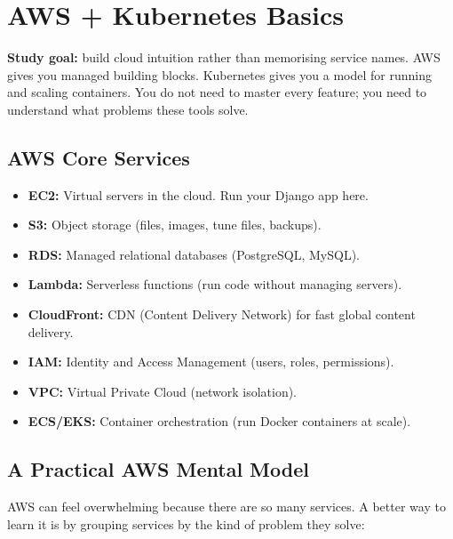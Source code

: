 \documentclass[12pt, a4paper, oneside]{book}
\begin{document}
\chapter{AWS + Kubernetes Basics}

\begin{studybox}
\textbf{Study goal:} build cloud intuition rather than memorising service names. AWS gives you managed building blocks. Kubernetes gives you a model for running and scaling containers. You do not need to master every feature; you need to understand what problems these tools solve.
\end{studybox}

\section{AWS Core Services}

\begin{itemize}[leftmargin=2em]
    \item \textbf{EC2:} Virtual servers in the cloud. Run your Django app here.
    \item \textbf{S3:} Object storage (files, images, tune files, backups).
    \item \textbf{RDS:} Managed relational databases (PostgreSQL, MySQL).
    \item \textbf{Lambda:} Serverless functions (run code without managing servers).
    \item \textbf{CloudFront:} CDN (Content Delivery Network) for fast global content delivery.
    \item \textbf{IAM:} Identity and Access Management (users, roles, permissions).
    \item \textbf{VPC:} Virtual Private Cloud (network isolation).
    \item \textbf{ECS/EKS:} Container orchestration (run Docker containers at scale).
\end{itemize}

\section{A Practical AWS Mental Model}

AWS can feel overwhelming because there are so many services. A better way to learn it is by grouping services by the kind of problem they solve:
\end{document}
